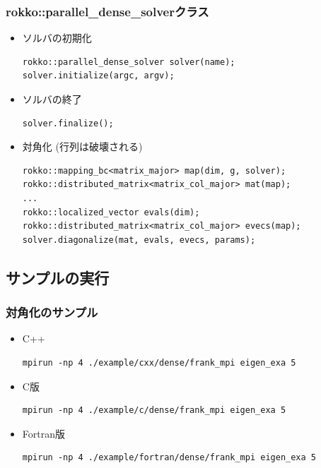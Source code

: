 \begin{frame}[c,fragile]
  \frametitle{rokko::parallel_dense_solverクラス}
  \begin{itemize}
  \item ソルバの初期化
\begin{lstlisting}
rokko::parallel_dense_solver solver(name);
solver.initialize(argc, argv);
\end{lstlisting}
  \item ソルバの終了
\begin{lstlisting}
solver.finalize();
\end{lstlisting}
  \item 対角化 (行列は破壊される)
\begin{lstlisting}
rokko::mapping_bc<matrix_major> map(dim, g, solver);
rokko::distributed_matrix<matrix_col_major> mat(map);
...
rokko::localized_vector evals(dim);
rokko::distributed_matrix<matrix_col_major> evecs(map);
solver.diagonalize(mat, evals, evecs, params);
\end{lstlisting}
  \end{itemize}
\end{frame}

\subsection*{サンプルの実行}

\begin{frame}[c,fragile]
  \frametitle{対角化のサンプル}
  \begin{itemize}
  \item C++ 
\begin{lstlisting}[style=shstyle]
mpirun -np 4 ./example/cxx/dense/frank_mpi eigen_exa 5
\end{lstlisting}
  \item C版 
\begin{lstlisting}[style=shstyle]
mpirun -np 4 ./example/c/dense/frank_mpi eigen_exa 5
\end{lstlisting}
  \item Fortran版 
\begin{lstlisting}[style=shstyle]
mpirun -np 4 ./example/fortran/dense/frank_mpi eigen_exa 5
\end{lstlisting}

\end{itemize}
\end{frame}

